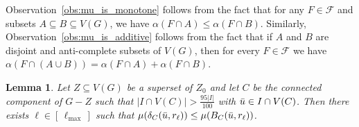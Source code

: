 \documentclass[11pt]{amsart}
\newtheorem{lemma}[theorem]{Lemma}
\begin{document}
Observation~\ref{obs:mu_is_monotone} follows from the fact that for any $F \in \mathcal{F}$ and subsets $A \subseteq B \subseteq V(G)$, we have $\alpha(F\cap A) \leq \alpha(F\cap B)$. Similarly, Observation~\ref{obs:mu_is_additive} follows from the fact that if $A$ and $B$ are disjoint and anti-complete subsets of $V(G)$, then for every $F \in \mathcal{F}$ we have $\alpha(F\cap(A \cup B)) = \alpha(F\cap A) + \alpha(F\cap B)$.\\

\begin{lemma}\label{lem:good_layer_cost_and_gain}
    Let $Z \subseteq V(G)$ be a superset of $Z_0$ and let $C$ be the connected component of $G - Z$ such that $|I\cap V(C)| > \frac{95|I|}{100}$ with $\Bar{u} \in I \cap V(C)$. Then there exists $\ell \in [\,\ell_{\max}\,]$ such that $\mu(\delta_C(\Bar{u}, r_\ell)) \leq \mu(B_C(\Bar{u}, r_\ell))$.
\end{lemma}
\end{document}
